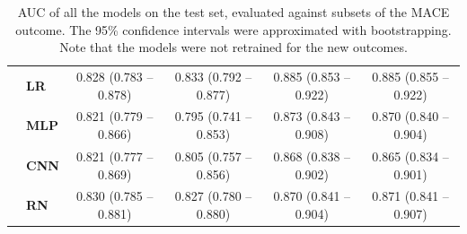\documentclass[preprint]{elsarticle}
\begin{document}
\begin{table}[H]
\begin{adjustbox}{center}
\begin{tabular}{@{}llcccc@{}}
& \textbf{LR} & 0.828 (0.783 -- 0.878) & 0.833 (0.792 -- 0.877) & 0.885 (0.853 -- 0.922) & 0.885 (0.855 -- 0.922) \\
& \textbf{MLP} & 0.821 (0.779 -- 0.866) & 0.795 (0.741 -- 0.853) & 0.873 (0.843 -- 0.908) & 0.870 (0.840 -- 0.904) \\
& \textbf{CNN} & 0.821 (0.777 -- 0.869) & 0.805 (0.757 -- 0.856) & 0.868 (0.838 -- 0.902) & 0.865 (0.834 -- 0.901) \\
& \textbf{RN} & 0.830 (0.785 -- 0.881) & 0.827 (0.780 -- 0.880) & 0.870 (0.841 -- 0.904) & 0.871 (0.841 -- 0.907) \\

\bottomrule
\end{tabular}
\end{adjustbox}
\caption{AUC of all the models on the test set, evaluated against subsets of the MACE outcome. The 95\% confidence intervals were approximated with bootstrapping. Note that the models were not retrained for the new outcomes.}
\label{table:appendix:outcomes}
\end{table}
\renewcommand{\arraystretch}{1}
\end{document}
